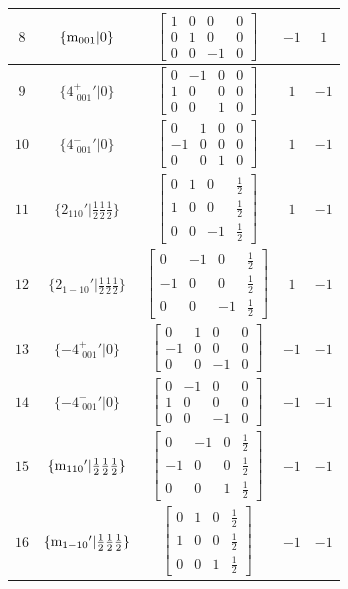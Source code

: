 \documentclass[fleqn,8pt]{jsarticle}
\begin{document}
\begin{longtable}{ccccc}
$ 8 $ & $ \{{\rm m}_{001}|0\} $ & $ \begin{bmatrix} 1 & 0 & 0 & 0 \\ 0 & 1 & 0 & 0 \\ 0 & 0 & -1 & 0 \end{bmatrix} $ & $ -1 $ & $ 1 $ \\ \hline
$ 9 $ & $ \{4^{+}_{\,\,001}{}'|0\} $ & $ \begin{bmatrix} 0 & -1 & 0 & 0 \\ 1 & 0 & 0 & 0 \\ 0 & 0 & 1 & 0 \end{bmatrix} $ & $ 1 $ & $ -1 $ \\ \hline
$ 10 $ & $ \{4^{-}_{\,\,001}{}'|0\} $ & $ \begin{bmatrix} 0 & 1 & 0 & 0 \\ -1 & 0 & 0 & 0 \\ 0 & 0 & 1 & 0 \end{bmatrix} $ & $ 1 $ & $ -1 $ \\ \hline
$ 11 $ & $ \{2{}_{110}{}'|\frac{1}{2} \frac{1}{2} \frac{1}{2}\} $ & $ \begin{bmatrix} 0 & 1 & 0 & \frac{1}{2} \\ 1 & 0 & 0 & \frac{1}{2} \\ 0 & 0 & -1 & \frac{1}{2} \end{bmatrix} $ & $ 1 $ & $ -1 $ \\ \hline
$ 12 $ & $ \{2{}_{1-10}{}'|\frac{1}{2} \frac{1}{2} \frac{1}{2}\} $ & $ \begin{bmatrix} 0 & -1 & 0 & \frac{1}{2} \\ -1 & 0 & 0 & \frac{1}{2} \\ 0 & 0 & -1 & \frac{1}{2} \end{bmatrix} $ & $ 1 $ & $ -1 $ \\ \hline
$ 13 $ & $ \{-4^{+}_{\,\,001}{}'|0\} $ & $ \begin{bmatrix} 0 & 1 & 0 & 0 \\ -1 & 0 & 0 & 0 \\ 0 & 0 & -1 & 0 \end{bmatrix} $ & $ -1 $ & $ -1 $ \\ \hline
$ 14 $ & $ \{-4^{-}_{\,\,001}{}'|0\} $ & $ \begin{bmatrix} 0 & -1 & 0 & 0 \\ 1 & 0 & 0 & 0 \\ 0 & 0 & -1 & 0 \end{bmatrix} $ & $ -1 $ & $ -1 $ \\ \hline
$ 15 $ & $ \{{\rm m}_{110}{}'|\frac{1}{2} \frac{1}{2} \frac{1}{2}\} $ & $ \begin{bmatrix} 0 & -1 & 0 & \frac{1}{2} \\ -1 & 0 & 0 & \frac{1}{2} \\ 0 & 0 & 1 & \frac{1}{2} \end{bmatrix} $ & $ -1 $ & $ -1 $ \\ \hline
$ 16 $ & $ \{{\rm m}_{1-10}{}'|\frac{1}{2} \frac{1}{2} \frac{1}{2}\} $ & $ \begin{bmatrix} 0 & 1 & 0 & \frac{1}{2} \\ 1 & 0 & 0 & \frac{1}{2} \\ 0 & 0 & 1 & \frac{1}{2} \end{bmatrix} $ & $ -1 $ & $ -1 $ \\
\end{longtable}
\end{document}
